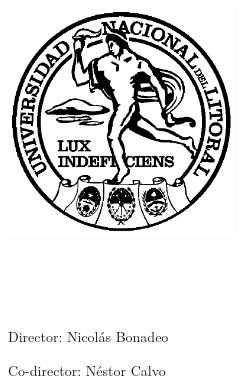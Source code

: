 \begin{titlepage}
	\begin{addmargin}[-1cm]{-3cm}
    \begin{center}
        \large  

        \hfill

        \vfill

        \begingroup
            \color{Black}\spacedallcaps{\myTitle} \\ \bigskip
        \endgroup

        \spacedlowsmallcaps{\myName}

        \vfill

        \includegraphics[width=6cm]{images/logoUNL} \\ \medskip

        \myDegree \\
        \myFaculty \\
        \myUni \\ \bigskip


        \vfill                      

        Director: Nicolás Bonadeo

        Co-director: Néstor Calvo

    \end{center}  
  \end{addmargin}       
\end{titlepage}   
